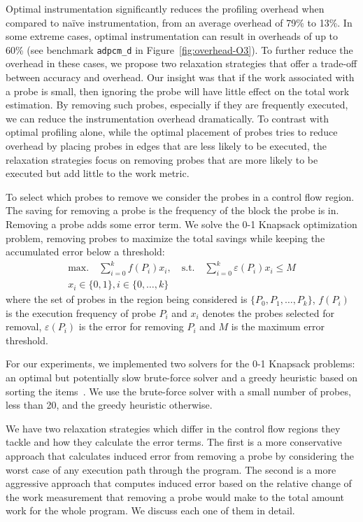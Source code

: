 Optimal instrumentation significantly reduces the profiling overhead when compared to na\"ive instrumentation, from an average overhead of
79\% to 13\%. In some extreme cases, optimal instrumentation can result in overheads of up to 60\% (see benchmark \texttt{adpcm\_d} in
Figure~\ref{fig:overhead-O3}). To further reduce the overhead in these cases, we propose two relaxation strategies that offer a trade-off
between accuracy and overhead. Our insight was that if the work associated with a probe is small, then ignoring the probe will have little
effect on the total work estimation. By removing such probes, especially if they are frequently executed, we can reduce the instrumentation
overhead dramatically. To contrast with optimal profiling alone, while the optimal placement of probes tries to reduce overhead by placing
probes in edges that are less likely to be executed, the relaxation strategies focus on removing probes that are more likely to be executed
but add little to the work metric.

To select which probes to remove we consider the probes in a control flow region. The saving for removing a probe is the frequency of the block the probe is in. Removing a probe adds some error term. We solve the 0-1 Knapsack optimization problem, removing probes to maximize the total savings while keeping the accumulated error below a threshold:
\begin{gather*}
    \textrm{max.}\quad\sum_{i=0}^{k} f(P_i)x_i,\quad
    \textrm{s.t.}\quad\sum_{i=0}^{k} \varepsilon(P_i)x_i \leq M \\
    x_i\in\{0,1\}, i\in\{0,\ldots,k\}
\end{gather*}
where the set of probes in the region being considered is $\{P_0, P_1, \ldots, P_k\}$, $f(P_i)$ is the execution frequency of probe $P_i$ and $x_i$ denotes the probes selected for removal, $\varepsilon(P_i)$ is the error for removing $P_i$ and $M$ is the maximum error threshold.

For our experiments, we implemented two solvers for the 0-1 Knapsack problems: an optimal but potentially slow brute-force solver and a
greedy heuristic based on sorting the items~\citep{dantzig57}. We use the brute-force solver with a small number of probes, less than
20, and the greedy heuristic otherwise.

We have two relaxation strategies which differ in the control flow regions they tackle and how they calculate the error terms. The first is
a more conservative approach that calculates induced error from removing a probe by considering the worst case of any execution path
through the program. The second is a more aggressive approach that computes induced error based on the relative change of the work
measurement that removing a probe would make to the total amount work for the whole program. We discuss each one of them in detail.

